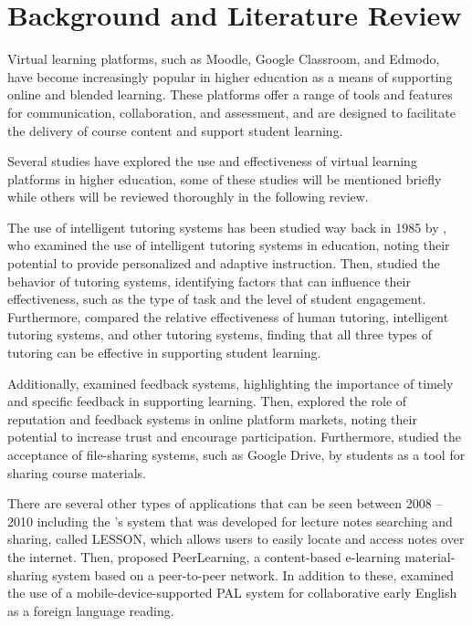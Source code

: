 \chapter{Background and Literature Review}

\begin{justify}
Virtual learning platforms, such as Moodle, Google Classroom, and Edmodo, have become increasingly popular in higher education as a means of supporting online and blended learning. These platforms offer a range of tools and features for communication, collaboration, and assessment, and are designed to facilitate the delivery of course content and support student learning.

\vspace{0.25cm}
\newendline
Several studies have explored the use and effectiveness of virtual learning platforms in higher education, some of these studies will be mentioned briefly while others will be reviewed thoroughly in the following review.

\vspace{0.25cm}
\newendline The use of intelligent tutoring systems has been studied way back in 1985 by \cite{anderson1985intelligent}, who examined the use of intelligent tutoring systems in education, noting their potential to provide personalized and adaptive instruction. Then, \cite{vanlehn2006behavior} studied the behavior of tutoring systems, identifying factors that can influence their effectiveness, such as the type of task and the level of student engagement. Furthermore, \cite{vanlehn2011relative} compared the relative effectiveness of human tutoring, intelligent tutoring systems, and other tutoring systems, finding that all three types of tutoring can be effective in supporting student learning.

\vspace{0.25cm}
\newendline Additionally, \cite{aastrom2008feedback} examined feedback systems, highlighting the importance of timely and specific feedback in supporting learning. Then, \cite{tadelis2016reputation} explored the role of reputation and feedback systems in online platform markets, noting their potential to increase trust and encourage participation. Furthermore, \cite{sadik2017students} studied the acceptance of file-sharing systems, such as Google Drive, by students as a tool for sharing course materials.

\vspace{0.25cm}
\newendline There are several other types of applications that can be seen between 2008 – 2010 including the \cite{zhou2010lesson}’s system that was developed for lecture notes searching and sharing, called LESSON, which allows users to easily locate and access notes over the internet. Then, \cite{wang2010peerlearning} proposed PeerLearning, a content-based e-learning material-sharing system based on a peer-to-peer network. In addition to these, \cite{lan2007mobile} examined the use of a mobile-device-supported PAL system for collaborative early English as a foreign language reading.


\end{justify}
